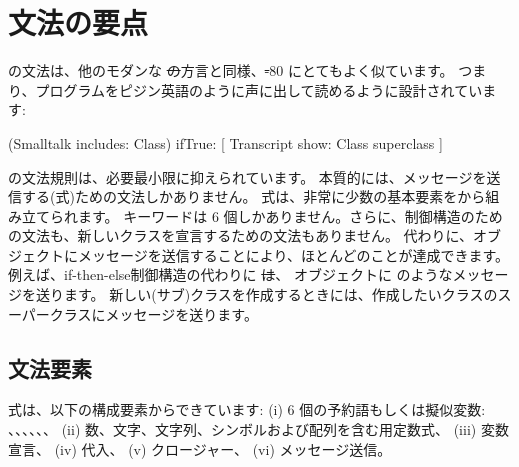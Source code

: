 \documentclass[a4paper,10pt,twoside]{book}
\begin{document}
	\renewcommand{\nnbb}[2]{} %
	\sloppy
\fi
\chapter{文法の要点}



\pharo の文法は、他のモダンな \st の方言と同様、\st-80 にとてもよく似ています。
つまり、プログラムをピジン英語のように声に出して読めるように設計されています:

\begin{code}{}
(Smalltalk includes: Class) ifTrue: [ Transcript show: Class superclass ]
\end{code}

\noindent
\pharo の文法規則は、必要最小限に抑えられています。
本質的には、メッセージを送信する(\ie 式)ための文法しかありません。 
式は、非常に少数の基本要素をから組み立てられます。
キーワードは 6 個しかありません。さらに、制御構造のための文法も、新しいクラスを宣言するための文法もありません。
代わりに、オブジェクトにメッセージを送信することにより、ほとんどのことが達成できます。
例えば、if-then-else制御構造の代わりに \st は、 オブジェクトに  のようなメッセージを送ります。
新しい(サブ)クラスを作成するときには、作成したいクラスのスーパークラスにメッセージを送ります。

\section{文法要素}

式は、以下の構成要素からできています:
(i) 6 個の予約語もしくは擬似変数:
、、、、、、
(ii) 数、文字、文字列、シンボルおよび配列を含む用定数式、
(iii) 変数宣言、
(iv) 代入、
(v) クロージャー、
(vi) メッセージ送信。
\end{document}
